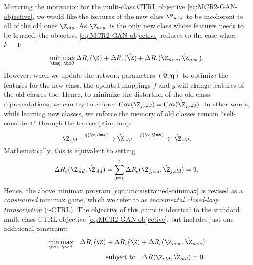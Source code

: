 \documentclass[../../book-main.tex]{subfiles}
\begin{document}
Mirroring the motivation for the multi-class CTRL objective \eqref{eq:MCR2-GAN-objective}, we would like the features of the new class $\Z_{new}$ to be incoherent to all of the old ones $\Z_{old}$. As $\Z_{new}$ is the only new class whose features needs to be learned, the objective \eqref{eq:MCR2-GAN-objective} reduces to the case where $k=1$:
\begin{equation}
\min_{\bm \eta} \max_{\bm \theta} \Delta{R_\epsilon(\Z)} + \Delta{R_\epsilon(\hat{\Z})}+\Delta{R_\epsilon(\Z_{new},\hat{\Z}_{new})}.
\label{eqn:unconstrained-minimax}
\end{equation}
However, when we update the network parameters $(\bm \theta,\bm \eta)$ to optimize the features for the new class, the updated mappings $f$ and $g$ will change features of the old classes too. Hence, to minimize the distortion of the old class representations, we can try to enforce $\mbox{Cov}(\Z_{j,old}) = \mbox{Cov}(\hat{\Z}_{j,old})$. In other words, while learning new classes, we enforce the memory of old classes remain ``self-consistent'' through the transcription loop:
\begin{equation}
\Z_{old} \xrightarrow{\hspace{2mm} g(\z,\bm \eta) \hspace{2mm}} \hat \X_{old} \xrightarrow{\hspace{2mm} f(\x, \bm \theta)\hspace{2mm}} \ \hat \Z_{old}.
\end{equation}
Mathematically, this is equivalent to setting 
$$\Delta R_\epsilon(\Z_{old},\hat{\Z}_{old}) \doteq  \sum_{j=1}^t \Delta R_\epsilon(\Z_{j,old},\hat{\Z}_{j,old}) = 0.$$  
Hence, the above minimax program \eqref{eqn:unconstrained-minimax} is revised as a {\em constrained} minimax game, which we refer to as  {\em incremental closed-loop transcription} (i-CTRL).
The objective of this game is identical to the standard multi-class CTRL objective \eqref{eq:MCR2-GAN-objective}, but includes just one additional constraint:
\begin{eqnarray}
\min_{\bm \eta} \max_{\bm \theta}  &&\Delta{R_\epsilon(\Z)}+\Delta{R_\epsilon(\hat{\Z})}+\Delta{R_\epsilon(\Z_{new},\hat{\Z}_{new})} \nonumber\\
&& \mbox{subject to} \quad  \Delta R(\Z_{old},\hat{\Z}_{old}) = 0.
\label{eqn:constrained-minimax}
\end{eqnarray}
\end{document}
